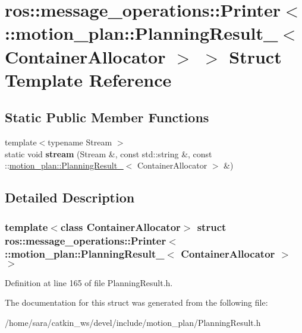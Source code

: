 \hypertarget{structros_1_1message__operations_1_1Printer_3_01_1_1motion__plan_1_1PlanningResult___3_01ContainerAllocator_01_4_01_4}{}\section{ros\+:\+:message\+\_\+operations\+:\+:Printer$<$ \+:\+:motion\+\_\+plan\+:\+:Planning\+Result\+\_\+$<$ Container\+Allocator $>$ $>$ Struct Template Reference}
\label{structros_1_1message__operations_1_1Printer_3_01_1_1motion__plan_1_1PlanningResult___3_01ContainerAllocator_01_4_01_4}
\subsection*{Static Public Member Functions}
\begin{DoxyCompactItemize}
\item 
\mbox{\label{structros_1_1message__operations_1_1Printer_3_01_1_1motion__plan_1_1PlanningResult___3_01ContainerAllocator_01_4_01_4_af4cbd50e6eae49d573105c709946af7b}} 
{\footnotesize template$<$typename Stream $>$ }\\static void {\bfseries stream} (Stream \&, const std\+::string \&, const \+::\hyperlink{structmotion__plan_1_1PlanningResult__}{motion\+\_\+plan\+::\+Planning\+Result\+\_\+}$<$ Container\+Allocator $>$ \&)
\end{DoxyCompactItemize}


\subsection{Detailed Description}
\subsubsection*{template$<$class Container\+Allocator$>$\newline
struct ros\+::message\+\_\+operations\+::\+Printer$<$ \+::motion\+\_\+plan\+::\+Planning\+Result\+\_\+$<$ Container\+Allocator $>$ $>$}



Definition at line 165 of file Planning\+Result.\+h.



The documentation for this struct was generated from the following file\+:\begin{DoxyCompactItemize}
\item 
/home/sara/catkin\+\_\+ws/devel/include/motion\+\_\+plan/Planning\+Result.\+h\end{DoxyCompactItemize}
